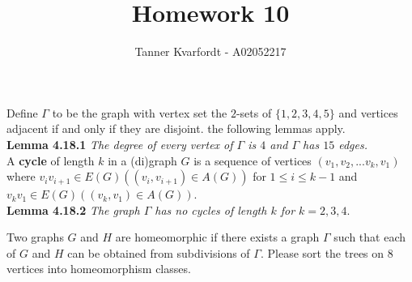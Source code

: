 \documentclass[12pt]{article}
\newenvironment{problem}[2][Problem]{\begin{trivlist}
\item[\hskip \labelsep {\bfseries #1}\hskip \labelsep {\bfseries #2.}]}{\end{trivlist}}
\begin{document}
 
 
\title{Homework 10}
\author{Tanner Kvarfordt - A02052217}
\maketitle

\noindent Define $\Gamma$ to be the graph with vertex set the $2$-sets of $\{1,2,3,4,5\}$ and vertices adjacent if and only if they are disjoint. the following lemmas apply. \\

\noindent\textbf{Lemma 4.18.1} \textit{The degree of every vertex of $\Gamma$ is $4$ and $\Gamma$ has $15$ edges.} \\

\noindent A \textbf{cycle} of length $k$ in a (di)graph $G$ is a sequence of vertices $(v_1,v_2,...v_k,v_1)$ where $v_iv_{i+1} \in E(G)((v_i,v_{i+1})\in A(G))$ for $1 \leq i \leq k-1$ and $v_kv_1 \in E(G)((v_k,v_1)\in A(G))$. \\

\noindent\textbf{Lemma 4.18.2} \textit{The graph $\Gamma$ has no cycles of length $k$ for $k=2,3,4$}.

\begin{problem}{1}
Two graphs $G$ and $H$ are homeomorphic if there exists a graph $\Gamma$ such that each of $G$ and $H$ can be obtained from subdivisions of $\Gamma$. Please sort the trees on 8 vertices into homeomorphism classes.
\end{problem}
 
\end{document}
